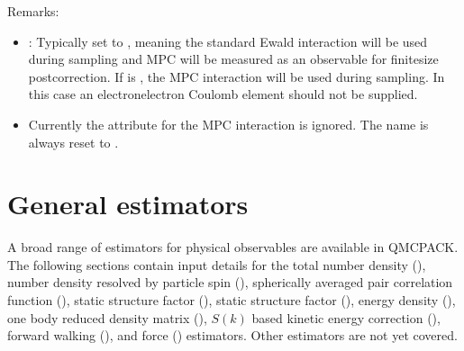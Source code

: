 \documentclass[letterpaper,10pt,english]{sphinxmanual}
\begin{document}
Remarks:
\begin{itemize}
\item {} 
: Typically set to , meaning the standard Ewald
interaction will be used during sampling and MPC will be measured as
an observable for finite\sphinxhyphen{}size post\sphinxhyphen{}correction. If  is
, the MPC interaction will be used during sampling. In this
case an electron\sphinxhyphen{}electron Coulomb  element should not be
supplied.

\item {} 
 Currently the  attribute for the MPC
interaction is ignored. The name is always reset to .

\end{itemize}
\def\sphinxLiteralBlockLabel{\label{\detokenize{hamiltonianobservable:listing-22}}}
\begin{sphinxVerbatim}[commandchars=\\\{\}]
        
\end{sphinxVerbatim}


\section{General estimators}
\label{\detokenize{hamiltonianobservable:general-estimators}}
A broad range of estimators for physical observables are available in QMCPACK.
The following sections contain input details for the total number
density (), number density resolved by particle spin
(), spherically averaged pair correlation function
(), static structure factor (), static structure factor
(), energy density (), one body reduced
density matrix (), \(S(k)\) based kinetic energy correction
(), forward walking (), and force
() estimators. Other estimators are not yet covered.
\end{document}
